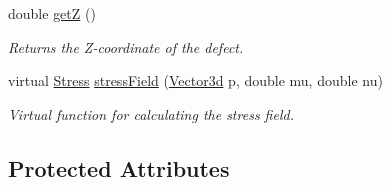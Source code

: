 \begin{DoxyCompactItemize}
double \hyperlink{classDefect_a6f59edeca7ca8bfa01c54fd6b1a62374}{get\-Z} ()
\begin{DoxyCompactList}\small\item\em Returns the Z-\/coordinate of the defect. \end{DoxyCompactList}\item 
virtual \hyperlink{classStress}{Stress} \hyperlink{classDefect_a5730a89ce804d75090c9fa35ffdfefa2}{stress\-Field} (\hyperlink{classVector3d}{Vector3d} p, double mu, double nu)
\begin{DoxyCompactList}\small\item\em Virtual function for calculating the stress field. \end{DoxyCompactList}\end{DoxyCompactItemize}
\subsection*{Protected Attributes}
